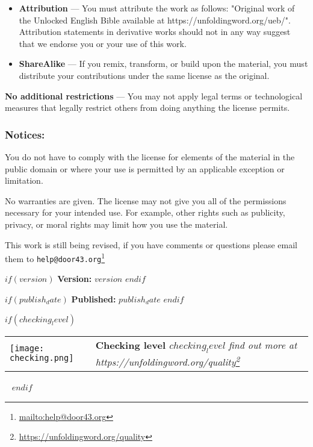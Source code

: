 \documentclass[$fontsize$pt,$if(lang)$$lang$,$endif$$if(papersize)$$papersize$,$endif$$for(classoption)$$classoption$$sep$,$endfor$,openany]{$documentclass$}
\renewcommand{\href}[2]{#2\footnote{\url{#1}}}
\begin{document}
\begin{itemize}
\item \textbf{Attribution} — You must attribute the work as follows: "Original work of the Unlocked English Bible available at https://unfoldingword.org/ueb/". Attribution statements in derivative works should not in any way suggest that we endorse you or your use of this work.
\item \textbf{ShareAlike} — If you remix, transform, or build upon the material, you must distribute your contributions under the same license as the original.
\end{itemize}

\textbf{No additional restrictions} — You may not apply legal terms or technological measures that legally restrict others from doing anything the license permits.

\subsubsection{Notices:}

You do not have to comply with the license for elements of the material in the public domain or where your use is permitted by an applicable exception or limitation.

No warranties are given. The license may not give you all of the permissions necessary for your intended use. For example, other rights such as publicity, privacy, or moral rights may limit how you use the material.

This work is still being revised, if you have comments or questions please email them to \href{mailto:help@door43.org}{\nolinkurl{help@door43.org}}

\vspace{10 mm}

$if(version)$
  \textbf{Version:} $version$
$endif$

$if(publish_date)$
  \textbf{Published:} $publish_date$
$endif$

$if(checking_level)$
\begin{tabular}{@{}p{1.5cm} p{10cm}@{}}
    \vspace{0pt}
    \texttt{[image: checking.png]}
    &
    \vspace{0pt}
    \textbf{Checking level $checking_level$}
    \newline
    \newline
    \em{find out more at \href{https://unfoldingword.org/quality}{https://unfoldingword.org/quality}}
\end{tabular}
\hfill\
$endif$
\end{document}
